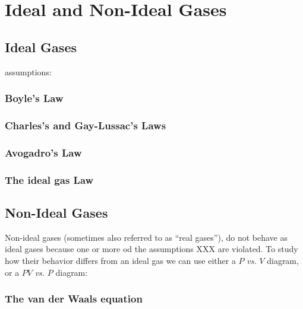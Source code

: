 \documentclass[
]{book}
\theoremstyle{definition}
\theoremstyle{definition}
\theoremstyle{definition}
\theoremstyle{remark}
\begin{document}
\hypertarget{RealGases}{%
\chapter{Ideal and Non-Ideal Gases}\label{RealGases}}

\hypertarget{ideal-gases}{%
\section{Ideal Gases}\label{ideal-gases}}

assumptions:

\hypertarget{boyles-law}{%
\subsection{Boyle's Law}\label{boyles-law}}

\hypertarget{charless-and-gay-lussacs-laws}{%
\subsection{Charles's and Gay-Lussac's Laws}\label{charless-and-gay-lussacs-laws}}

\hypertarget{avogadros-law}{%
\subsection{Avogadro's Law}\label{avogadros-law}}

\hypertarget{the-ideal-gas-law}{%
\subsection{The ideal gas Law}\label{the-ideal-gas-law}}

\hypertarget{non-ideal-gases}{%
\section{Non-Ideal Gases}\label{non-ideal-gases}}

Non-ideal gases (sometimes also referred to as ``real gases''), do not behave as ideal gases because one or more od the assumptions XXX are violated. To study how their behavior differs from an ideal gas we can use either a \(P\) \emph{vs.} \(V\) diagram, or a \(PV\) \emph{vs.} \(P\) diagram:

\hypertarget{the-van-der-waals-equation}{%
\subsection{The van der Waals equation}\label{the-van-der-waals-equation}}
\end{document}
